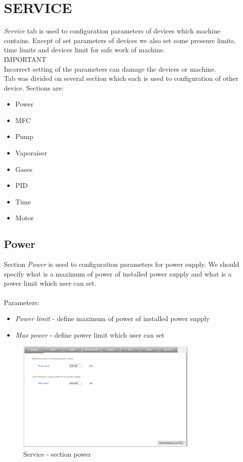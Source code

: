 \section {SERVICE}

\textit{Service} tab is used to configuration parameters of devices which machine contains. Except of set parameters of devices we also set some pressure limits, time limits and devices limit for safe work of machine.\\

IMPORTANT\\
Incorrect setting of the parameters can damage the devices or machine.\\

Tab was divided on several section which each is used to configuration of other device. Sections are:

\begin{itemize}
	\item Power 
	\item MFC
	\item Pump
	\item Vaporaiser
	\item Gases
	\item PID
	\item Time
	\item Motor
\end{itemize}

\subsection{Power}

Section \textit{Power} is used to configuration parameters for power supply. We should specify what is a maximum of power of installed power supply and what is a power limit which user can set. \\\\
Parameters:

\begin{itemize}
	\item \textit{Power limit} - define maximum of power of installed power supply 
	\item \textit{Max power} - define  power limit which user can set
\end{itemize}

	\begin{figure}[!h] 
	\centering \includegraphics[width=0.8\textwidth]{Graphic/Service/Power.png}	
	\caption{Service - section power}
	\label{alerts_window}
	\end{figure}
	\FloatBarrier


